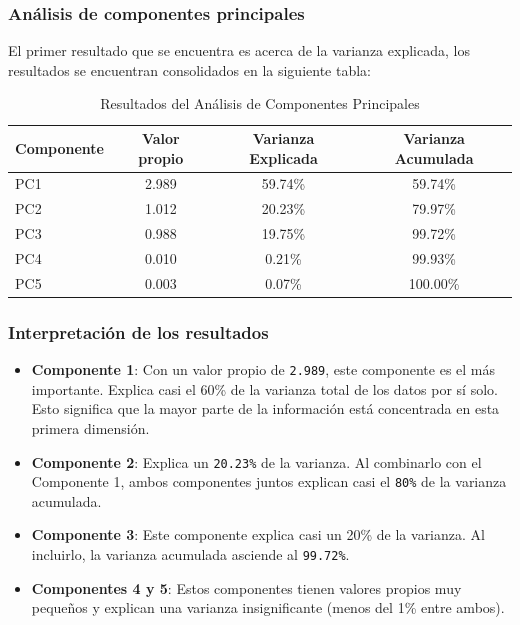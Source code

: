 \documentclass[journal]{IEEEtran}
\begin{document}
	\subsubsection{Análisis de componentes principales}
	El primer resultado que se encuentra es acerca de la varianza explicada, los resultados se encuentran consolidados en la siguiente tabla:

	\begin{table}[H]
		\centering
		\caption{Resultados del Análisis de Componentes Principales}
		\begin{tabular}{l c c c}
			\toprule
			Componente & Valor propio & Varianza Explicada & Varianza Acumulada \\
			\midrule
			PC1 & 2.989 & 59.74\% & 59.74\% \\
			PC2 & 1.012 & 20.23\% & 79.97\% \\
			PC3 & 0.988 & 19.75\% & 99.72\% \\
			PC4 & 0.010 & 0.21\%  & 99.93\% \\
			PC5 & 0.003 & 0.07\% & 100.00\% \\
			\bottomrule
		\end{tabular}
		\label{tab:pca_results}
	\end{table}
	\subsubsection{Interpretación de los resultados}
	\begin{itemize}
		\item \textbf{Componente 1}: Con un valor propio de \texttt{2.989}, este componente es el más importante. Explica casi el 60\% de la varianza total de los datos por sí solo. Esto significa que la mayor parte de la información está concentrada en esta primera dimensión.
		\item \textbf{Componente 2}: Explica un \texttt{20.23\%} de la varianza. Al combinarlo con el Componente 1, ambos componentes juntos explican casi el \texttt{80\%} de la varianza acumulada.
		\item \textbf{Componente 3}: Este componente explica casi un 20\% de la varianza. Al incluirlo, la varianza acumulada asciende al \texttt{99.72\%}.
		\item \textbf{Componentes 4 y 5}: Estos componentes tienen valores propios muy pequeños y explican una varianza insignificante (menos del 1\% entre ambos).
	\end{itemize}
\end{document}
